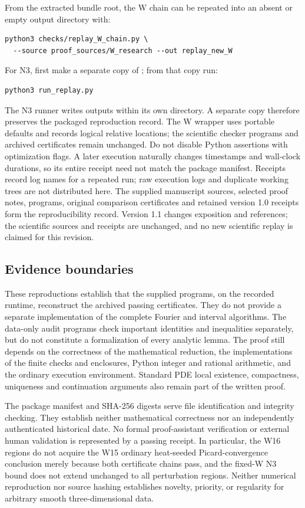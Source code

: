 From the extracted bundle root, the W chain can be repeated into an absent or
empty output directory with:
\begin{verbatim}
python3 checks/replay_W_chain.py \
  --source proof_sources/W_research --out replay_new_W
\end{verbatim}
For N3, first make a separate copy of ; from that copy run:
\begin{verbatim}
python3 run_replay.py
\end{verbatim}
The N3 runner writes outputs within its own directory. A separate copy
therefore preserves the packaged reproduction record. The W wrapper uses
portable defaults and records logical relative locations; the scientific
checker programs and archived certificates remain unchanged. Do not disable Python
assertions with optimization flags.  A later execution naturally changes
timestamps and wall-clock durations, so its entire receipt need not match
the package manifest. Receipts record log names for a repeated run; raw
execution logs and duplicate working trees are not distributed here.
The supplied manuscript sources, selected proof notes, programs, original
comparison certificates and retained version 1.0 receipts form the
reproducibility record. Version 1.1 changes exposition and references;
the scientific sources and receipts are unchanged, and no new scientific
replay is claimed for this revision.

\subsection{Evidence boundaries}

These reproductions establish that the supplied programs, on the recorded
runtime, reconstruct the archived passing certificates.  They do not provide
a separate implementation of the complete Fourier and interval algorithms.
The data-only audit programs check important identities and inequalities
separately, but do not constitute a formalization of every analytic lemma.
The proof still depends on the correctness of the mathematical reduction,
the implementations of the finite checks and enclosures, Python integer and
rational arithmetic, and the ordinary execution environment.  Standard PDE
local existence, compactness, uniqueness and continuation arguments also
remain part of the written proof.

The package manifest and SHA-256 digests serve file identification and
integrity checking.  They establish neither mathematical correctness nor an
independently authenticated historical date.  No formal proof-assistant
verification or external human validation is represented by a passing
receipt.  In particular, the W16 regions do not acquire the W15 ordinary
heat-seeded Picard-convergence conclusion merely because both certificate
chains pass, and the fixed-W N3 bound does not extend unchanged to all
perturbation regions.  Neither numerical reproduction nor source hashing
establishes novelty, priority, or regularity for arbitrary smooth
three-dimensional data.
